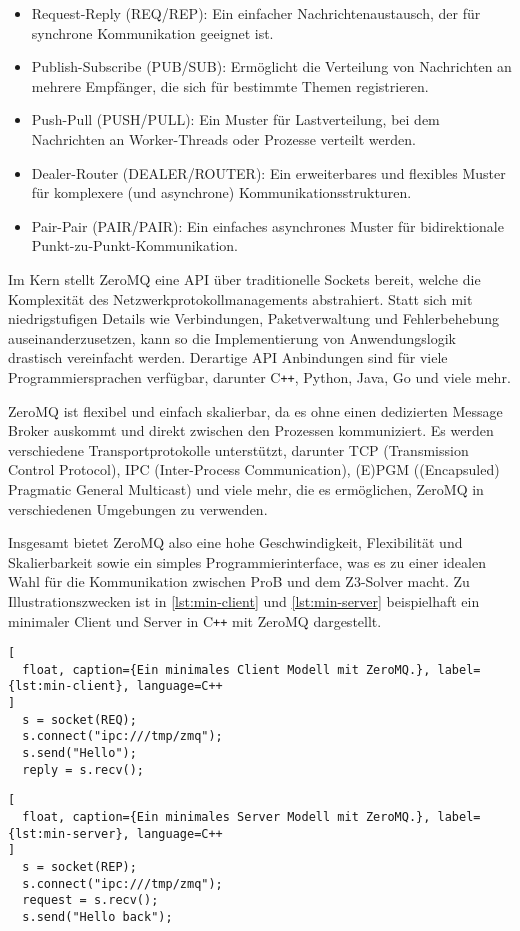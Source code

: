 \begin{itemize}
    \item Request-Reply (REQ/REP): Ein einfacher Nachrichtenaustausch, der für synchrone Kommunikation geeignet ist.
    \item Publish-Subscribe (PUB/SUB): Ermöglicht die Verteilung von Nachrichten an mehrere Empfänger, die sich für bestimmte Themen registrieren.
    \item Push-Pull (PUSH/PULL): Ein Muster für Lastverteilung, bei dem Nachrichten an Worker-Threads oder Prozesse verteilt werden.
    \item Dealer-Router (DEALER/ROUTER): Ein erweiterbares und flexibles Muster für komplexere (und asynchrone) Kommunikationsstrukturen.
    \item Pair-Pair (PAIR/PAIR): Ein einfaches asynchrones Muster für bidirektionale Punkt-zu-Punkt-Kommunikation.
\end{itemize}

Im Kern stellt ZeroMQ eine API über traditionelle Sockets bereit, welche die Komplexität des Netzwerkprotokollmanagements abstrahiert.
Statt sich mit niedrigstufigen Details wie Verbindungen, Paketverwaltung und Fehlerbehebung auseinanderzusetzen, kann so die Implementierung von Anwendungslogik drastisch vereinfacht werden.
Derartige API Anbindungen sind für viele Programmiersprachen verfügbar, darunter C\texttt{++}, Python, Java, Go und viele mehr.

ZeroMQ ist flexibel und einfach skalierbar, da es ohne einen dedizierten Message Broker auskommt und direkt zwischen den Prozessen kommuniziert.
Es werden verschiedene Transportprotokolle unterstützt, darunter TCP (Transmission Control Protocol), IPC (Inter-Process Communication), (E)PGM ((Encapsuled) Pragmatic General Multicast) und viele mehr, die es ermöglichen, ZeroMQ in verschiedenen Umgebungen zu verwenden.

Insgesamt bietet ZeroMQ also eine hohe Geschwindigkeit, Flexibilität und Skalierbarkeit sowie ein simples Programmierinterface,
was es zu einer idealen Wahl für die Kommunikation zwischen ProB und dem Z3-Solver macht.
Zu Illustrationszwecken ist in \cref{lst:min-client} und \cref{lst:min-server}  beispielhaft ein minimaler Client und Server in C\texttt{++} mit ZeroMQ dargestellt.

\begin{lstlisting}[
  float, caption={Ein minimales Client Modell mit ZeroMQ.}, label={lst:min-client}, language=C++
]
  s = socket(REQ);
  s.connect("ipc:///tmp/zmq");
  s.send("Hello");
  reply = s.recv();
\end{lstlisting}

\begin{lstlisting}[
  float, caption={Ein minimales Server Modell mit ZeroMQ.}, label={lst:min-server}, language=C++
]
  s = socket(REP);
  s.connect("ipc:///tmp/zmq");
  request = s.recv();
  s.send("Hello back");
\end{lstlisting}
